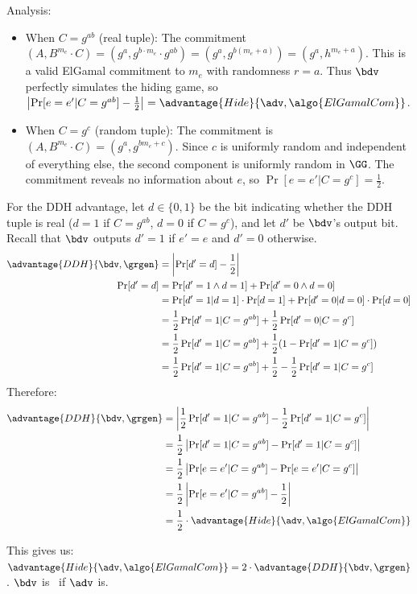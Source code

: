 \begin{mysolution}
  Analysis:
  \begin{itemize}
      \item When $C = g^{ab}$ (real tuple): The commitment $(A, B^{m_e} \cdot C) = (g^a, g^{b \cdot m_e} \cdot g^{ab}) = (g^a, g^{b(m_e + a)}) = (g^a, h^{m_e + a})$.
      This is a valid ElGamal commitment to $m_e$ with randomness $r = a$.
      Thus $\bdv$ perfectly simulates the hiding game, so $\left|\Pr[e = e' | C = g^{ab}] - \frac{1}{2}\right| = \advantage{Hide}{\adv, \algo{ElGamalCom}}$.
      \item When $C = g^c$ (random tuple): The commitment is $(A, B^{m_e} \cdot C) = (g^a, g^{bm_e + c})$.
      Since $c$ is uniformly random and independent of everything else, the second component is uniformly random in $\GG$.
      The commitment reveals no information about $e$, so $\Pr[e = e' | C = g^c] = \frac{1}{2}$.
  \end{itemize}
  For the DDH advantage, let $d \in \{0, 1\}$ be the bit indicating whether the DDH tuple is real ($d = 1$ if $C = g^{ab}$, $d = 0$ if $C = g^c$), and let $d'$ be $\bdv$'s output bit.
  Recall that $\bdv$ outputs $d' = 1$ if $e' = e$ and $d' = 0$ otherwise.
  \begin{align*}
  \advantage{DDH}{\bdv, \grgen} &= \left|\Pr[d' = d] - \frac{1}{2}\right|\\
  \Pr[d' = d] &= \Pr[d' = 1 \wedge d = 1] + \Pr[d' = 0 \wedge d = 0]\\
  &= \Pr[d' = 1 | d = 1] \cdot \Pr[d = 1] + \Pr[d' = 0 | d = 0] \cdot \Pr[d = 0]\\
  &= \frac{1}{2} \Pr[d' = 1 | C = g^{ab}] + \frac{1}{2} \Pr[d' = 0 | C = g^c]\\
  &= \frac{1}{2} \Pr[d' = 1 | C = g^{ab}] + \frac{1}{2}(1 - \Pr[d' = 1 | C = g^c])\\
  &= \frac{1}{2} \Pr[d' = 1 | C = g^{ab}] + \frac{1}{2} - \frac{1}{2}\Pr[d' = 1 | C = g^c]
  \end{align*}
  Therefore:
  \begin{align*}
  \advantage{DDH}{\bdv, \grgen} &= \left|\frac{1}{2} \Pr[d' = 1 | C = g^{ab}] - \frac{1}{2}\Pr[d' = 1 | C = g^c]\right|\\
  &= \frac{1}{2} \left|\Pr[d' = 1 | C = g^{ab}] - \Pr[d' = 1 | C = g^c]\right|\\
  &= \frac{1}{2} \left|\Pr[e = e' | C = g^{ab}] - \Pr[e = e' | C = g^c]\right|\\
  &= \frac{1}{2} \left|\Pr[e = e' | C = g^{ab}] - \frac{1}{2}\right|\\
  &= \frac{1}{2} \cdot \advantage{Hide}{\adv, \algo{ElGamalCom}}
  \end{align*}

  This gives us: $\advantage{Hide}{\adv, \algo{ElGamalCom}} = 2 \cdot \advantage{DDH}{\bdv, \grgen}$. $\bdv$ is \ppt\ if $\adv$ is.
\end{mysolution}
\fi

